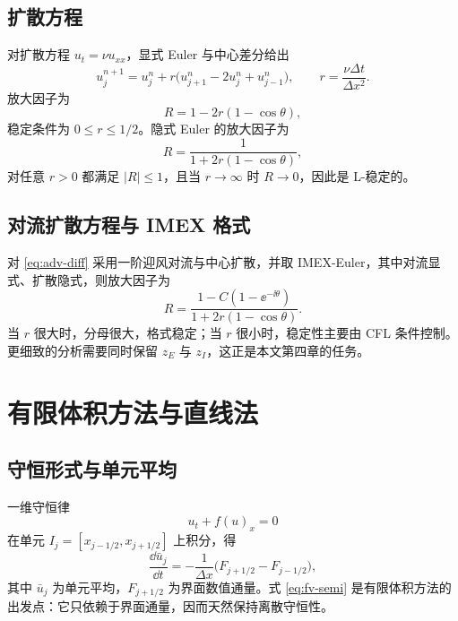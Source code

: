 \subsection{扩散方程}

对扩散方程 $u_t=\nu u_{xx}$，显式 Euler 与中心差分给出
\begin{equation}
  u_j^{n+1}=u_j^n+r\bigl(u_{j+1}^n-2u_j^n+u_{j-1}^n\bigr),
  \qquad r=\frac{\nu\Delta t}{\Delta x^2}.
\end{equation}
放大因子为
\begin{equation}
  R=1-2r(1-\cos\theta),
\end{equation}
稳定条件为 $0\le r\le1/2$。隐式 Euler 的放大因子为
\begin{equation}
  R=\frac{1}{1+2r(1-\cos\theta)},
\end{equation}
对任意 $r>0$ 都满足 $|R|\le1$，且当 $r\to\infty$ 时 $R\to0$，因此是 L-稳定的。

\subsection{对流扩散方程与 IMEX 格式}

对 \eqref{eq:adv-diff} 采用一阶迎风对流与中心扩散，并取 IMEX-Euler，其中对流显式、扩散隐式，则放大因子为
\begin{equation}
  R=\frac{1-C(1-\ee^{-\ii\theta})}{1+2r(1-\cos\theta)}.
  \label{eq:imex-adv-diff-R}
\end{equation}
当 $r$ 很大时，分母很大，格式稳定；当 $r$ 很小时，稳定性主要由 CFL 条件控制。更细致的分析需要同时保留 $z_E$ 与 $z_I$，这正是本文第四章的任务。

\section{有限体积方法与直线法}
\label{sec:fv-mol}

\subsection{守恒形式与单元平均}

一维守恒律
\begin{equation}
  u_t+f(u)_x=0
  \label{eq:conservation-law}
\end{equation}
在单元 $I_j=[x_{j-1/2},x_{j+1/2}]$ 上积分，得
\begin{equation}
  \frac{\dd \bar u_j}{\dd t}
  =-\frac{1}{\Delta x}\bigl(F_{j+1/2}-F_{j-1/2}\bigr),
  \label{eq:fv-semi}
\end{equation}
其中 $\bar u_j$ 为单元平均，$F_{j+1/2}$ 为界面数值通量。式 \eqref{eq:fv-semi} 是有限体积方法的出发点：它只依赖于界面通量，因而天然保持离散守恒性。

